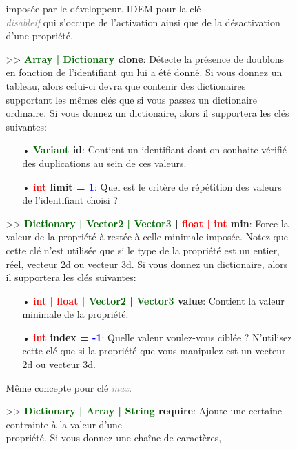 \documentclass[a4paper, 11pt]{article}
\begin{document}
\begin{description}
\begin{itemize}
\begin{itemize}
				imposée par le développeur. IDEM pour la clé \textit{\textcolor{gray}{\\disableif}} qui 
				s'occupe de l'activation ainsi que de la désactivation d'une propriété.\\
				\item[>> \textbf{\textcolor{darkgreen}{Array | Dictionary} clone}:] Détecte la présence de 
				doublons en fonction de l'identifiant qui lui a été donné. Si vous donnez un tableau, alors 
				celui-ci devra que contenir des dictionaires supportant les mêmes clés que si vous passez un 
				dictionaire ordinaire. Si vous donnez un dictionaire, alors il supportera les clés 
				suivantes:
				\begin{itemize}
				    \item[• \textbf{\textcolor{darkgreen}{Variant} id}:] Contient un identifiant dont-on
				    souhaite vérifié des duplications au sein de ces valeurs.
				    \item[• \textbf{\textcolor{red}{int} limit = \textcolor{blue}{1}}:] Quel est le critère 
				    de répétition des valeurs de l'identifiant choisi ?\\
				\end{itemize}
				\item[>> \textbf{\textcolor{darkgreen}{Dictionary | Vector2 | Vector3} | \textcolor{red}
				{float | int} min}:] Force la valeur de la propriété à restée à celle minimale imposée. 
				Notez que cette clé n'est utilisée que si le type de la propriété est un entier, réel, 
				vecteur 2d ou vecteur 3d. Si vous donnez un dictionaire, alors il supportera les clés 
				suivantes:
				\begin{itemize}
					\item[• \textbf{\textcolor{red}{int | float} | \textcolor{darkgreen}{Vector2 | Vector3} 
					value}:] Contient la valeur minimale de la propriété.
					\item[• \textbf{\textcolor{red}{int} index = \textcolor{blue}{-1}}:] Quelle valeur 
					voulez-vous ciblée ? N'utilisez cette clé que si la propriété que vous manipulez est un 
					vecteur 2d ou vecteur 3d.
				\end{itemize}
				Même concepte pour clé \textit{\textcolor{gray}{max}}.\\
				\item[>> \textbf{\textcolor{darkgreen}{Dictionary | Array | String} require}:] Ajoute une
				certaine contrainte à la valeur d'une \\propriété. Si vous donnez une chaîne de caractères,

\end{itemize}
\end{itemize}
\end{description}
\end{document}
